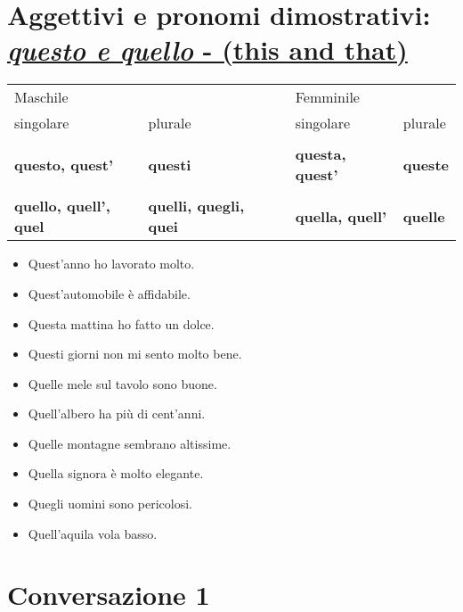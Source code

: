 \documentclass[letter,11pt]{article}
\begin{document}
\section*{Aggettivi e pronomi dimostrativi:
\underline{\emph{questo e quello} - (this and that)}}
\vskip 0.2in

\begin{tabular}{ |p{3cm}| p{3cm}| p{1cm}| p{3cm}| p{3cm}|}
    Maschile  &  &  & Femminile &  \\
    singolare & plurale &  & singolare & plurale  \\
    \hline
    \hline
     &  &  &  &  \\ \hline
    {\bf questo, quest'}  & {\bf questi} &   & {\bf questa, quest'} & {\bf queste}   \\ \hline
    &  &  &   &  \\ \hline
    {\bf quello, quell', quel}  & {\bf quelli, quegli, quei} &   & {\bf quella, quell'} & {\bf quelle}   \\ \hline
    \hline
\end{tabular}

\vskip 0.4in

\begin{multicols}{2}
\begin{itemize}
    \item Quest'anno ho lavorato molto.
    \item Quest'automobile è affidabile.
    \item Questa mattina ho fatto un dolce.
    \item Questi giorni non mi sento molto bene.
    \item Quelle mele sul tavolo sono buone.
    \item Quell'albero ha più di cent'anni.
    \item Quelle montagne sembrano altissime.
    \item Quella signora è molto elegante.
    \item Quegli uomini sono pericolosi.
    \item Quell'aquila vola basso.


\end{itemize}
\end{multicols}
\vskip 0.2in

\section*{Conversazione 1}
\vskip 0.2in
\end{document}
